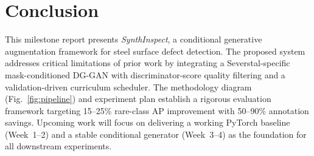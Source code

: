 \documentclass[conference]{IEEEtran}
\begin{document}
\section{Conclusion}

This milestone report presents \textit{SynthInspect}, a conditional
generative augmentation framework for steel surface defect detection.
The proposed system addresses critical limitations of prior work by
integrating a Severstal-specific mask-conditioned DG-GAN with
discriminator-score quality filtering and a validation-driven
curriculum scheduler. The methodology diagram (Fig.~\ref{fig:pipeline})
and experiment plan establish a rigorous evaluation framework targeting
15--25\% rare-class AP improvement with 50--90\% annotation savings.
Upcoming work will focus on delivering a working PyTorch baseline
(Week~1--2) and a stable conditional generator (Week~3--4) as the
foundation for all downstream experiments.
\end{document}
